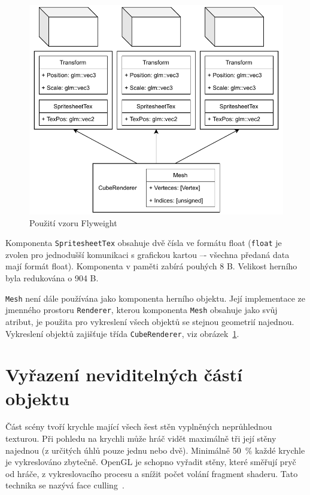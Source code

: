 \documentclass[thesis=M,czech]{FITthesis}[2019/12/23]
\begin{document}
\begin{figure}\centering
	\includegraphics[width=\textwidth]{images/go_components_fw_2}
	\caption[Použití vzoru Flyweight]{Použití vzoru Flyweight}\label{fig:go_components_fw}
\end{figure}

Komponenta \texttt{SpritesheetTex} obsahuje dvě čísla ve formátu float (\texttt{float} je zvolen pro jednodušší komunikaci s grafickou kartou –- všechna předaná data mají formát float). Komponenta v paměti zabírá pouhých 8 B. Velikost herního byla redukována o 904 B.

\texttt{Mesh} není dále používána jako komponenta herního objektu. Její implementace ze jmenného prostoru \texttt{Renderer}, kterou komponenta \texttt{Mesh} obsahuje jako svůj atribut, je použita pro vykreslení všech objektů se stejnou geometrií najednou. Vykreslení objektů zajišťuje třída \texttt{CubeRenderer}, viz obrázek~\ref{fig:go_components_fw}.


\section{Vyřazení neviditelných částí objektu}

Část scény tvoří krychle mající všech šest stěn vyplněných neprůhlednou texturou. Při pohledu na krychli může hráč vidět maximálně tři její stěny najednou (z určitých úhlů pouze jednu nebo dvě). Minimálně 50~\% každé krychle je vykreslováno zbytečně. OpenGL je schopno vyřadit stěny, které směřují pryč od hráče, z vykreslovacího procesu a snížit počet volání fragment shaderu. Tato technika se nazývá face culling~\cite{lopgl_faceculling}.
\end{document}
